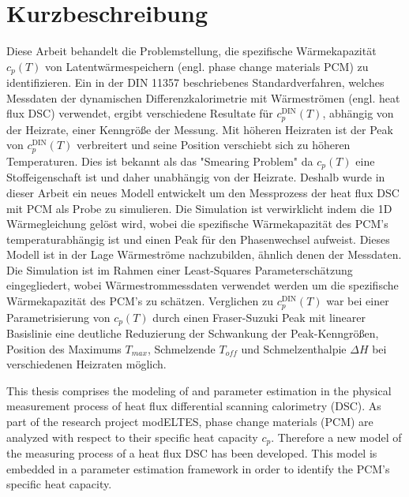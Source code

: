 \documentclass{scrartcl}[12pt, halfparskip]
\numberwithin{equation}{section}
\numberwithin{figure}{section}
\numberwithin{table}{section}
\begin{document}
\section*{Kurzbeschreibung}
Diese Arbeit behandelt die Problemstellung, die spezifische W\"armekapazit\"at $c_p(T)$ von Latentw\"armespeichern (engl. phase change materials PCM) zu identifizieren.
Ein in der DIN 11357 beschriebenes Standardverfahren, welches Messdaten der dynamischen Differenzkalorimetrie mit W\"armestr\"omen (engl. heat flux DSC) verwendet, ergibt verschiedene Resultate für $c_p^{\text{DIN}}(T)$, abh\"angig von der Heizrate, einer Kenngr\"oße der Messung. 
Mit h\"oheren Heizraten ist der Peak von $c_p^{\text{DIN}}(T)$ verbreitert und seine Position verschiebt sich zu h\"oheren Temperaturen. 
Dies ist bekannt als das "Smearing Problem" da $c_p(T)$ eine Stoffeigenschaft ist und daher unabhängig von der Heizrate.
Deshalb wurde in dieser Arbeit ein neues Modell entwickelt um den Messprozess der heat flux DSC mit PCM als Probe zu simulieren. 
Die Simulation ist verwirklicht indem die 1D Wärmegleichung gelöst wird, wobei die spezifische Wärmekapazität des PCM's temperaturabhängig ist und einen Peak für den Phasenwechsel aufweist. 
Dieses Modell ist in der Lage Wärmeströme nachzubilden, ähnlich denen der Messdaten. 
Die Simulation ist im Rahmen einer Least-Squares Parameterschätzung eingegliedert, wobei Wärmestrommessdaten verwendet werden um die spezifische Wärmekapazität des PCM's zu schätzen.  
Verglichen zu $c_p^{\text{DIN}}(T)$ war bei einer Parametrisierung von $c_p(T)$ durch einen Fraser-Suzuki Peak mit linearer Basislinie eine deutliche Reduzierung der Schwankung der Peak-Kenngrößen, Position des Maximums $T_{max}$, Schmelzende $T_{off}$ und Schmelzenthalpie $\Delta H$ bei verschiedenen Heizraten möglich. 


\newpage



\tableofcontents 
\newpage


This thesis comprises the modeling of and parameter estimation in the physical measurement process of heat flux differential scanning calorimetry (DSC). As part of the research project modELTES, phase change materials (PCM) are analyzed with respect to their specific heat capacity $c_p$. Therefore a new model of the measuring process of a heat flux DSC has been developed. This model is embedded in a parameter estimation framework in order to identify the PCM's specific heat capacity. \\
\end{document}
